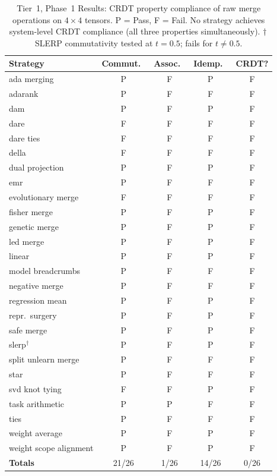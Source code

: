 \documentclass[10pt,letterpaper]{article}
\begin{document}
\begin{table}[t]
\centering
\caption{Tier~1, Phase~1 Results: CRDT property compliance of raw merge operations on $4\times 4$ tensors. P = Pass, F = Fail. No strategy achieves system-level CRDT compliance (all three properties simultaneously). $\dagger$\,SLERP commutativity tested at $t=0.5$; fails for $t \neq 0.5$.}
\label{tab:phase1_controlled}
\small
\begin{tabular}{lcccc}
\toprule
Strategy & Commut.\ & Assoc.\ & Idemp.\ & CRDT?\\
\midrule
ada merging        & P & F & P & F \\
adarank            & P & F & F & F \\
dam                & P & F & P & F \\
dare               & F & F & F & F \\
dare ties          & F & F & F & F \\
della              & F & F & F & F \\
dual projection    & P & F & P & F \\
emr                & P & F & F & F \\
evolutionary merge & F & F & F & F \\
fisher merge       & P & F & P & F \\
genetic merge      & P & F & P & F \\
led merge          & P & F & P & F \\
linear             & P & F & P & F \\
model breadcrumbs  & P & F & F & F \\
negative merge     & P & F & F & F \\
regression mean    & P & F & P & F \\
repr.\ surgery & P & F & P & F \\
safe merge         & P & F & P & F \\
slerp$^{\dagger}$  & P & F & P & F \\
split unlearn merge & P & F & F & F \\
star               & P & F & F & F \\
svd knot tying     & F & F & P & F \\
task arithmetic    & P & P & F & F \\
ties               & P & F & F & F \\
weight average     & P & F & P & F \\
weight scope alignment & P & F & P & F \\
\midrule
\textbf{Totals}    & 21/26 & 1/26 & 14/26 & 0/26 \\
\bottomrule
\end{tabular}
\end{table}
\end{document}
